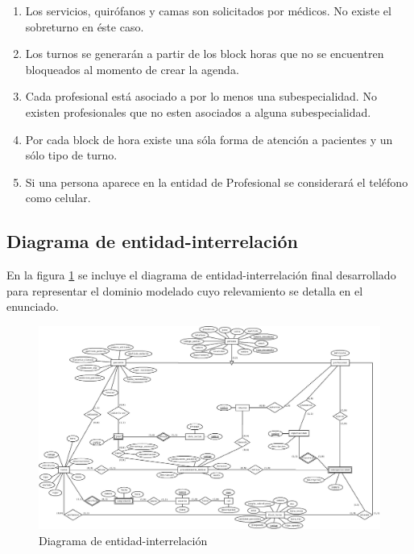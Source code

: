 \documentclass[a4paper,11pt]{article}
\begin{document}
\begin{enumerate}
    \item Los servicios, quirófanos y camas son solicitados por médicos. No existe 
    el sobreturno en éste caso.
    
    \item Los turnos se generarán a partir de los block horas que no se encuentren 
    bloqueados al momento de crear la agenda.
    
    \item Cada profesional está asociado a por lo menos una subespecialidad. No existen 
    profesionales que no esten asociados a alguna subespecialidad.
    
    \item Por cada block de hora existe una sóla forma de atención a pacientes y un 
    sólo tipo de turno.

    \item Si una persona aparece en la entidad de Profesional se considerará el teléfono
    como celular.

\end{enumerate}



\subsection{Diagrama de entidad-interrelación}

 En la figura \ref{fig:der} se incluye el diagrama de entidad-interrelación
 final desarrollado para representar el dominio modelado cuyo relevamiento se
 detalla en el enunciado.

\begin{figure}[h!t]
  \centering
  \includegraphics[width=1.4\textwidth, angle=90]{build/images/der.jpeg}
  \caption{Diagrama de entidad-interrelación} \label{fig:der}
\end{figure}
\end{document}

